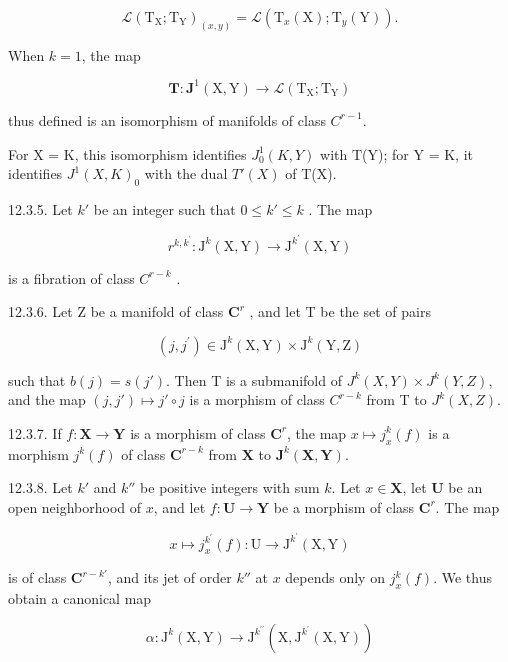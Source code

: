 \[
\mathcal {L} (\mathrm{T} _ {\mathrm{X}}; \mathrm{T} _ {\mathrm{Y}}) _ {(x, y)} = \mathcal {L} (\mathrm{T} _ {x} (\mathrm{X}); \mathrm{T} _ {y} (\mathrm{Y})).
\]

When \(k = 1\), the map

\[
\mathbf {T} \colon \mathbf {J} ^ {1} (\mathrm{X}, \mathrm{Y}) \rightarrow \mathcal {L} (\mathrm{T} _ {\mathrm{X}}; \mathrm{T} _ {\mathrm{Y}})
\]

thus defined is an isomorphism of manifolds of class \(C^{r-1}\).

For X = K, this isomorphism identifies \(J_{0}^{1}(K, Y)\) with T(Y); for Y = K, it identifies \(J^{1}(X, K)_{0}\) with the dual \(T'(X)\) of T(X).

12.3.5. Let \(k'\) be an integer such that \(0 \leqslant k' \leqslant k\) . The map

\[
r ^ {k, k ^ {\prime}}: \mathrm{J} ^ {k} (\mathrm{X}, \mathrm{Y}) \rightarrow \mathrm{J} ^ {k ^ {\prime}} (\mathrm{X}, \mathrm{Y})\tag{cf. 12.1.5}
\]

is a fibration of class \(C^{r-k}\) .

12.3.6. Let Z be a manifold of class \(\mathbf{C}^r\) , and let T be the set of pairs

\[
(j, j ^ {\prime}) \in \mathrm{J} ^ {k} (\mathrm{X}, \mathrm{Y}) \times \mathrm{J} ^ {k} (\mathrm{Y}, \mathrm{Z})
\]

such that \(b(j) = s(j')\). Then T is a submanifold of \(J^k(X, Y) \times J^k(Y, Z)\), and the map \((j, j') \mapsto j' \circ j\) is a morphism of class \(C^{r-k}\) from T to \(J^k(X, Z)\).

12.3.7. If \(f: \mathbf{X} \to \mathbf{Y}\) is a morphism of class \(\mathbf{C}^r\), the map \(x \mapsto j_x^k(f)\) is a morphism \(j^k(f)\) of class \(\mathbf{C}^{r-k}\) from \(\mathbf{X}\) to \(\mathbf{J}^k(\mathbf{X}, \mathbf{Y})\).

12.3.8. Let \(k'\) and \(k''\) be positive integers with sum \(k\). Let \(x \in \mathbf{X}\), let \(\mathbf{U}\) be an open neighborhood of \(x\), and let \(f: \mathbf{U} \to \mathbf{Y}\) be a morphism of class \(\mathbf{C}^{r}\). The map

\[
x \mapsto j _ {x} ^ {k ^ {\prime}} (f) \colon \mathrm{U} \to \mathrm{J} ^ {k ^ {\prime}} (\mathrm{X}, \mathrm{Y})
\]

is of class \(\mathbf{C}^{r - k'}\), and its jet of order \(k''\) at \(x\) depends only on \(j_x^k (f)\). We thus obtain a canonical map

\[
\alpha \colon \mathrm{J} ^ {k} (\mathrm{X}, \mathrm{Y}) \rightarrow \mathrm{J} ^ {k ^ {\prime \prime}} (\mathrm{X}, \mathrm{J} ^ {k ^ {\prime}} (\mathrm{X}, \mathrm{Y}))
\]

